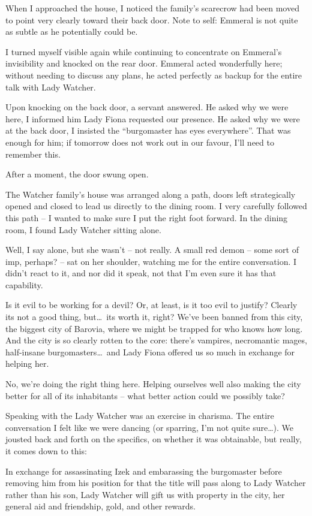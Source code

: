When I approached the house, I noticed the family's scarecrow had been moved to point very clearly toward their back door. Note to self: Emmeral is not quite as subtle as he potentially could be.

I turned myself visible again while continuing to concentrate on Emmeral's invisibility and knocked on the rear door. Emmeral acted wonderfully here; without needing to discuss any plans, he acted perfectly as backup for the entire talk with Lady Watcher.

Upon knocking on the back door, a servant answered. He asked why we were here, I informed him Lady Fiona requested our presence. He asked why we were at the back door, I insisted the ``burgomaster has eyes everywhere''. That was enough for him; if tomorrow does not work out in our favour, I'll need to remember this.

After a moment, the door swung open.

The Watcher family's house was arranged along a path, doors left strategically opened and closed to lead us directly to the dining room. I very carefully followed this path -- I wanted to make sure I put the right foot forward. In the dining room, I found Lady Watcher sitting alone.

Well, I say alone, but she wasn't -- not really. A small red demon -- some sort of imp, perhaps? -- sat on her shoulder, watching me for the entire conversation. I didn't react to it, and nor did it speak, not that I'm even sure it has that capability.

Is it evil to be working for a devil? Or, at least, is it too evil to justify? Clearly its not a good thing, but\dots\ its worth it, right? We've been banned from this city, the biggest city of Barovia, where we might be trapped for who knows how long. And the city is so clearly rotten to the core: there's vampires, necromantic mages, half-insane burgomasters\dots\ and Lady Fiona offered us so much in exchange for helping her.

No, we're doing the right thing here. Helping ourselves well also making the city better for all of its inhabitants -- what better action could we possibly take?

Speaking with the Lady Watcher was an exercise in charisma. The entire conversation I felt like we were dancing (or sparring, I'm not quite sure\dots). We jousted back and forth on the specifics, on whether it was obtainable, but really, it comes down to this:

In exchange for assassinating Izek and embarassing the burgomaster before removing him from his position for that the title will pass along to Lady Watcher rather than his son, Lady Watcher will gift us with property in the city, her general aid and friendship, gold, and other rewards.

